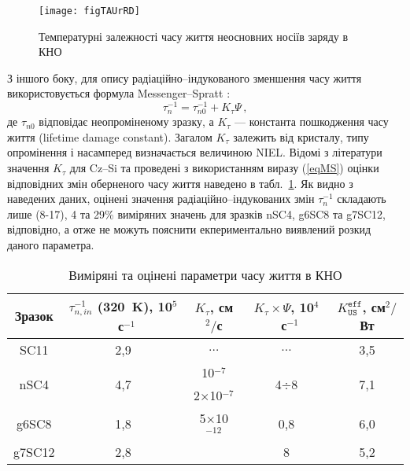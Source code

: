 \begin{figure}[b]
\center
\texttt{[image: figTAUrRD]}
\caption{\label{figTAUrRD}
Температурні залежності часу життя неосновних носіїв заряду в КНО
\FigCaptionSSCRD
}%
\end{figure}

З іншого боку, для опису радіаційно--індукованого зменшення часу життя використовується формула Messenger--Spratt \cite{Markvart}:
\begin{equation}
\label{eqMS}
\tau_n^{-1}=\tau_{n0}^{-1}+K_\tau\Psi\,,
\end{equation}
де
$\tau_{n0}$ відповідає неопроміненому зразку, а
$K_\tau$ --- константа пошкодження часу життя (lifetime damage constant).
Загалом $K_\tau$ залежить від кристалу, типу опромінення і насамперед визначається величиною NIEL.
Відомі з літератури значення $K_\tau$ для Cz--Si та проведені з використанням виразу (\ref{eqMS}) оцінки відповідних
змін оберненого часу життя наведено в табл.~\ref{tabTAUn}.
Як видно з наведених даних, оцінені значення радіаційно--індукованих змін $\tau_n^{-1}$ складають лише
(8-17), 4 та 29\% виміряних значень для зразків nSC4, g6SC8 та g7SC12, відповідно, а отже не можуть
пояснити екпериментально виявлений розкид даного параметра.

\begin{table}
\caption{\label{tabTAUn}Виміряні та оцінені параметри часу життя в КНО
}
\center
\begin{tabular}{|c|c|c|c|c|}
\hline
Зразок &$\tau_{n,in}^{-1}$ (320~K), 10$^5$~с$^{-1}$&$K_\tau$, см$^2/$с&$K_\tau\times\Psi$, 10$^4$~с$^{-1}$&$K_\mathtt{US}^\mathtt{eff}$, см$^2/$Вт\\ \hline
SC11&2,9&$\ldots$&$\ldots$&3,5\\ \hline
\multirow{2}{*}{nSC4}&\multirow{2}{*}{4,7}&10$^{-7}$ \cite{NIEL:Jafari}&\multirow{2}{*}{4$\div$8}&\multirow{2}{*}{7,1}\\ %
&&2$\times$10$^{-7}$ \cite{n:Gaubas}&&\\ \hline
g6SC8&1,8&5$\times$10$^{-12}$&0,8&6,0\\ \cline{1-2} \cline{4-5}%
g7SC12&2,8& \cite{NIEL:Jafari,gamma:Kolkov} &8&5,2\\ \hline
\end{tabular}
\end{table}

